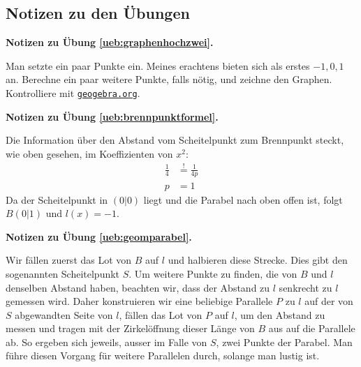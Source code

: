 \documentclass[%
11pt,%
twoside,%
titlepage,%
german,%
headsepline%
]{scrartcl}
\newcommand{\geogebralink}{\href{https://www.geogebra.org/calculator}{\texttt{geogebra.org}}}
\newcommand{\concatueb}[1]{ueb:#1}%
\newcommand{\concatlsg}[1]{lsg:#1}%
\newenvironment{lsg}[1]{%
    \par\noindent\textbf{Notizen zu Übung \ref{\concatueb{#1}}.}%
    \label{\concatlsg{#1}}
}{%
    \par%
}
\begin{document}
\clearpage

\subsection{Notizen zu den Übungen}

\begin{lsg}{graphenhochzwei}
    Man setzte ein paar Punkte ein. Meines erachtens bieten sich als erstes $-1,0,1$ an. Berechne ein paar weitere Punkte, falls nötig, und zeichne den Graphen. Kontrolliere mit \geogebralink.
\end{lsg}
\begin{lsg}{brennpunktformel}
    Die Information über den Abstand vom Scheitelpunkt zum Brennpunkt steckt, wie oben gesehen, im Koeffizienten von $x^2$:
    \begin{align*}
        \frac{1}{4} &\stackrel{!}{=} \frac{1}{4p}\tag{$\cdot p, \cdot 4$}\\
        p &= 1
    \end{align*}
    Da der Scheitelpunkt in $(0|0)$ liegt und die Parabel nach oben offen ist, folgt $B(0|1)$ und $l(x)=-1$.
\end{lsg}
\begin{lsg}{geomparabel}
    Wir fällen zuerst das Lot von $B$ auf $l$ und halbieren diese Strecke. Dies gibt den sogenannten Scheitelpunkt $S$. Um weitere Punkte zu finden, die von $B$ und $l$ denselben Abstand haben, beachten wir, dass der Abstand zu $l$ senkrecht zu $l$ gemessen wird. Daher konstruieren wir eine beliebige Parallele $P$ zu $l$ auf der von $S$ abgewandten Seite von $l$, fällen das Lot von $P$ auf $l$, um den Abstand zu messen und tragen mit der Zirkelöffnung dieser Länge von $B$ aus auf die Parallele ab. So ergeben sich jeweils, ausser im Falle von $S$, zwei Punkte der Parabel. Man führe diesen Vorgang für weitere Parallelen durch, solange man lustig ist.

\begin{center}
\end{center}

\end{lsg}
\end{document}
